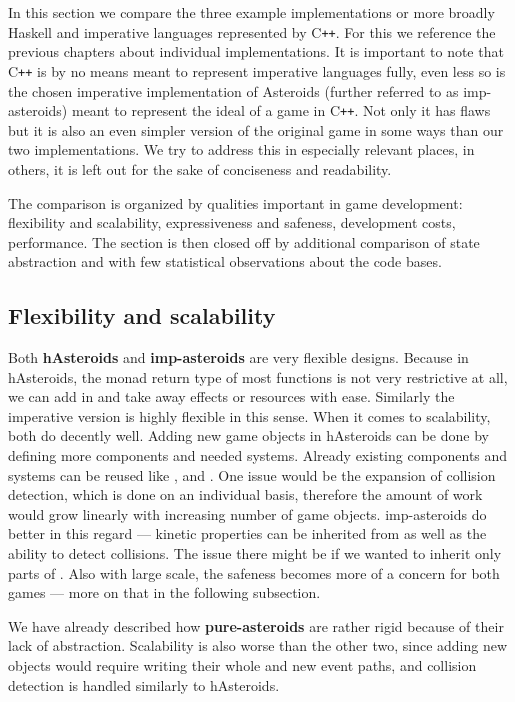 \documentclass[
  digital, %
  color,   %
  table,   %
  oneside, %
  lof,     %
  lot,     %
]{fithesis3}
\newcommand{\cpp}{C\nolinebreak\texttt{+}\nolinebreak\texttt{+}}
\begin{document}
{In this section we compare the three example implementations or more broadly Haskell and
imperative languages represented by \cpp{}.
For this we reference the previous chapters about individual implementations.
It is important to note that \cpp{} is by no means meant
to represent imperative languages fully, even less so is the chosen imperative implementation
of Asteroids (further referred to as imp-asteroids) meant to represent
the ideal of a game in \cpp{}. Not only it has flaws but it is also an even
simpler version of the original game in some ways than our two implementations.
We try to address this in especially relevant places,
in others, it is left out for the sake of conciseness and readability.

The comparison is organized by qualities important in game development:
flexibility and scalability, expressiveness and safeness, development costs, performance.
The section is then closed off by additional comparison of state abstraction
and with few statistical observations about the code bases.



\subsection{Flexibility and scalability}

Both \textbf{hAsteroids} and \textbf{imp-asteroids} are very flexible designs.
Because in hAsteroids, the monad return type of most functions is not very
restrictive at all, we can add in and take away effects or resources with ease.
Similarly the imperative version is highly flexible in this sense. When it comes
to scalability, both do decently well. Adding new game objects in hAsteroids can be done by
defining more components and needed systems. Already existing components and systems can be reused
like ,  and .
One issue would be the expansion of collision detection,
which is done on an individual basis, therefore the amount of work
would grow linearly with increasing number of game objects.
imp-asteroids do better in this regard --- kinetic properties can
be inherited from  as well as the ability to detect collisions.
The issue there might be if we wanted to inherit only parts of .
Also with large scale, the safeness becomes more of a concern for both games
--- more on that in the following subsection.

We have already described how \textbf{pure-asteroids} are rather rigid because of
their lack of abstraction. Scalability is also worse than the other two, since
adding new objects would require writing their whole  and
new event paths, and collision detection is handled similarly to hAsteroids.



}
\end{document}
